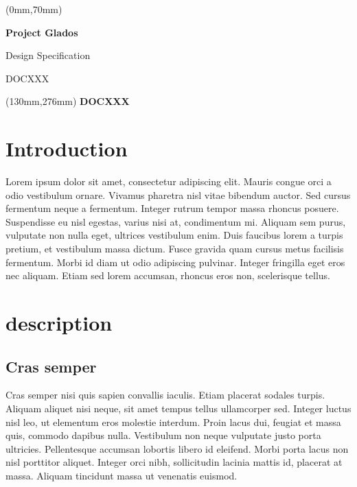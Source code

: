 \documentclass[11pt,a4paper,english]{report}
\def\wl{\par \vspace{\baselineskip}}
\begin{document}
\textblockorigin{0cm}{0cm}
\begin{textblock*}{210mm}(0mm,70mm)
\centering
{ \bfseries\Huge
Project Glados
\wl
\vspace{-1.2ex}
Design Specification
\wl
\vspace{-1.2ex}
 DOCXXX
   }
\end{textblock*}

\begin{textblock*}{80mm}(130mm,276mm)
\huge\bfseries
DOCXXX
\end{textblock*}




\pagestyle{fancy}

\tableofcontents
\pagestyle{fancy}
\chapter{Introduction}


\par Lorem ipsum dolor sit amet, consectetur adipiscing elit. Mauris congue orci a odio vestibulum ornare. Vivamus pharetra nisl vitae bibendum auctor. Sed cursus fermentum neque a fermentum. Integer rutrum tempor massa rhoncus posuere. Suspendisse eu nisl egestas, varius nisi at, condimentum mi. Aliquam sem purus, vulputate non nulla eget, ultrices vestibulum enim. Duis faucibus lorem a turpis pretium, et vestibulum massa dictum. Fusce gravida quam cursus metus facilisis fermentum. Morbi id diam ut odio adipiscing pulvinar. Integer fringilla eget eros nec aliquam. Etiam sed lorem accumsan, rhoncus eros non, scelerisque tellus.

\chapter{description}

\section{Cras semper}
\par Cras semper nisi quis sapien convallis iaculis. Etiam placerat sodales turpis. Aliquam aliquet nisi neque, sit amet tempus tellus ullamcorper sed. Integer luctus nisl leo, ut elementum eros molestie interdum. Proin lacus dui, feugiat et massa quis, commodo dapibus nulla. Vestibulum non neque vulputate justo porta ultricies. Pellentesque accumsan lobortis libero id eleifend. Morbi porta lacus non nisl porttitor aliquet. Integer orci nibh, sollicitudin lacinia mattis id, placerat at massa. Aliquam tincidunt massa ut venenatis euismod.
\end{document}
